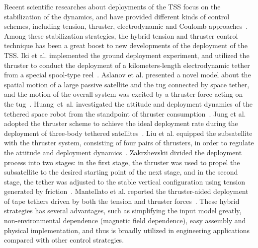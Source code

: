 \documentclass[3p]{elsarticle}
\theoremstyle{plain}
\theoremstyle{remark}
\begin{document}
Recent scientific researches about deployments of the TSS focus on the stabilization of the dynamics, and have provided different kinds of control schemes, including tension, thruster, electrodynamic and Coulomb approaches~\cite{kojima2015stabilisation,qi2016dynamics,zhong2016research}. Among these stabilization strategies, the hybrid tension and thruster control technique has been a great boost to new developments of the deployment of the TSS. Iki et al. implemented the ground deployment experiment, and utilized the thruster to conduct the deployment of a kilometers-length electrodynamic tether from a special spool-type reel~\cite{iki2014experiments}. Aslanov et al. presented a novel model about the spatial motion of a large passive satellite and the tug connected by space tether, and the motion of the overall system was excited by a thruster force acting on the tug~\cite{aslanov2013dynamics}. Huang~et~al. investigated the attitude and deployment dynamics of the tethered space robot from the standpoint of thruster consumption~\cite{huang2015coupling}. Jung et al. adopted the thruster scheme to achieve the ideal deployment rate during the deployment of three-body tethered satellites~\cite{jung2015nonlinear}. Liu et al. equipped the subsatellite with the thruster system, consisting of four pairs of thrusters, in order to regulate the attitude and deployment dynamics~\cite{liu2014attitude}. Zakrzhevskii divided the deployment process into two stages: in the first stage, the thruster was used to propel the subsatellite to the desired starting point of the next stage, and in the second stage, the tether was adjusted to the stable vertical configuration using tension generated by friction~\cite{zakrzhevskii2016method}. Mantellato et al. reported the thruster-aided deployment of tape tethers driven by both the tension and thruster forces~\cite{mantellato2015thrust}. These hybrid strategies has several advantages, such as simplifying the input model greatly, non-environmental dependence (magnetic field dependence), easy assembly and physical implementation, and thus is broadly utilized in engineering applications compared with other control strategies.
\end{document}
